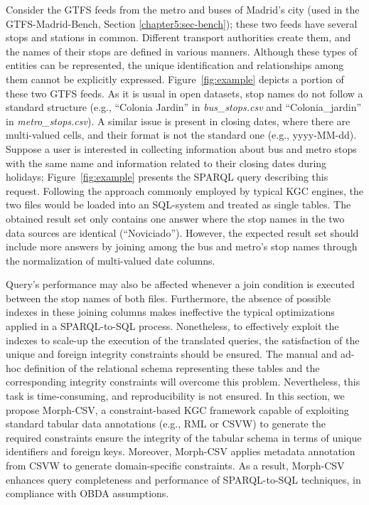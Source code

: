 Consider the GTFS feeds from the metro and buses of Madrid's city (used in the GTFS-Madrid-Bench, Section \ref{chapter5:sec-bench}); these two feeds have several stops and stations in common. Different transport authorities create them, and the names of their stops are defined in various manners. Although these types of entities can be represented, the unique identification and relationships among them cannot be explicitly expressed. Figure~\ref{fig:example} depicts a portion of these two GTFS feeds. As it is usual in open datasets, stop names do not follow a standard structure (e.g., ``Colonia Jardin'' in \textit{bus\_stops.csv} and ``Colonia\_jardin'' in \textit{metro\_stops.csv}). A similar issue is present in closing dates, where there are multi-valued cells, and their format is not the standard one (e.g., yyyy-MM-dd). Suppose a user is interested in collecting information about bus and metro stops with the same name and information related to their closing dates during holidays; Figure~\ref{fig:example} presents the SPARQL query describing this request. Following the approach commonly employed by typical KGC engines, the two files would be loaded into an SQL-system and treated as single tables. The obtained result set only contains one answer where the stop names in the two data sources are identical (``Noviciado''). However, the expected result set should include more answers by joining among the bus and metro's stop names through the normalization of multi-valued date columns. 

Query's performance may also be affected whenever a join condition is executed between the stop names of both files. Furthermore, the absence of possible indexes in these joining columns makes ineffective the typical optimizations applied in a SPARQL-to-SQL process. Nonetheless, to effectively exploit the indexes to scale-up the execution of the translated queries, the satisfaction of the unique and foreign integrity constraints should be ensured. The manual and ad-hoc definition of the relational schema representing these tables and the corresponding integrity constraints will overcome this problem. Nevertheless, this task is time-consuming, and reproducibility is not ensured. In this section, we propose Morph-CSV, a constraint-based KGC framework capable of exploiting standard tabular data annotations (e.g., RML or CSVW) to generate the required constraints ensure the integrity of the tabular schema in terms of unique identifiers and foreign keys. Moreover, Morph-CSV applies metadata annotation from CSVW to generate domain-specific constraints. As a result, Morph-CSV enhances query completeness and performance of SPARQL-to-SQL techniques, in compliance with OBDA assumptions.


